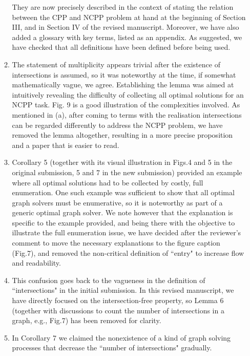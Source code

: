 \documentclass[11pt]{article}
\begin{document}
\begin{enumerate}[I.]
\begin{enumerate}
They are now precisely described in the context of stating the relation between the CPP and NCPP problem at hand at the beginning of Section III, 
and in Section IV of the revised manuscript. 
Moreover, we have also added a glossary with key terms, listed as an appendix. 
As suggested, we have checked that all definitions have been defined before being used. 
\item The statement of multiplicity appears trivial after the existence of intersections is assumed, so it was noteworthy at the time, if somewhat mathematically vague, we agree. 
Establishing the lemma was aimed at intuitively revealing the difficulty of collecting all optimal solutions for an NCPP task. Fig. 9 is a good illustration of the complexities involved. 
As mentioned in (a), after coming to terms with the realisation intersections can be regarded differently to address the NCPP problem, %
we have removed the lemma altogether, resulting in a more precise proposition and a paper that is easier to read. 
\item Corollary 5 (together with its visual illustration in Figs.4 and 5 in the original submission, 5 and 7 in the new submission) provided an example where all optimal solutions 
had to be collected by costly, full enumeration. 
One such example was sufficient to show that all optimal graph solvers must be enumerative, so it is noteworthy as part of a generic optimal graph solver. 
We note however that the explanation is specific to the example provided, and being there with the objective to illustrate the full enumeration issue, we have decided after the reviewer's comment to move the necessary explanations to the figure caption (Fig.7), and removed the non-critical definition of ``entry" to increase flow and readability. 
\item This confusion goes back to the vagueness in the definition of ``intersections" in the initial submission. 
In this revised manuscript, we have directly focused on the intersection-free property, so Lemma 6 (together with discussions to count the number of intersections in a graph, e.g., Fig.7) has been removed for clarity. 
\item In Corollary 7 we claimed the nonexistence of a kind of graph solving processes that decrease the ``number of intersections" gradually. 

\end{enumerate}
\end{enumerate}
\end{document}
